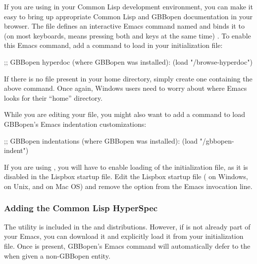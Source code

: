 \documentclass[10pt,twoside,english,pdftex]{article}
\begin{document}
%
If you are using
 in your Common
Lisp development environment, you can make it easy to bring up appropriate
Common Lisp and GBBopen documentation in your browser.  The file
 defines an interactive Emacs
command named  and binds it to  (on most
keyboards,  means pressing both  and  keys at
the same time) .  To enable this Emacs command, add a command to load
 in your 
initialization file:
%
\W\supp
\begin{example}
  ;; GBBopen hyperdoc (where GBBopen was installed):
  (load "/browse-hyperdoc")
\end{example}

If there is no  file present in your home directory, simply
create one containing the above command. Once again, Windows users need to
worry about where Emacs looks for their ``home'' directory.

While you are editing your  file, you might also want to add a
command to load GBBopen's Emacs indentation customizations:
%
\W\supp
\begin{example}
  ;; GBBopen indentations (where GBBopen was installed):
  (load "/gbbopen-indent")
\end{example}

If you are using
, you
will have to enable loading of the  initialization file, as it is
disabled in the Lispbox startup file.  Edit the Lispbox startup file
( on Windows,  on Unix, and
 on Mac OS)
and remove the  option from the Emacs invocation line.

\subsubsection*{Adding the Common Lisp HyperSpec}

The 
utility is included in the
 and
 distributions.
However, if  is not already part of your Emacs, you can
download it and explicitly load it from your  initialization
file.  Once  is present, GBBopen's 
Emacs command will automatically defer to the  when given a
non-GBBopen entity.
\end{document}
